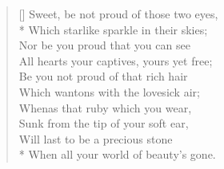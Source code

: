 \documentclass[MAIN]{subfiles}
\begin{document}
\settowidth{\versewidth}{Sweet, be not proud of those two eyes,}
\begin{verse}[\versewidth]
Sweet, be not proud of those two eyes,\\*
Which starlike sparkle in their skies;\\
Nor be you proud that you can see\\
All hearts your captives, yours yet free;\\
Be you not proud of that rich hair\\
Which wantons with the lovesick air;\\
Whenas that ruby which you wear,\\
Sunk from the tip of your soft ear,\\
Will last to be a precious stone\\*
When all your world of beauty's gone.
\end{verse}
\end{document}
